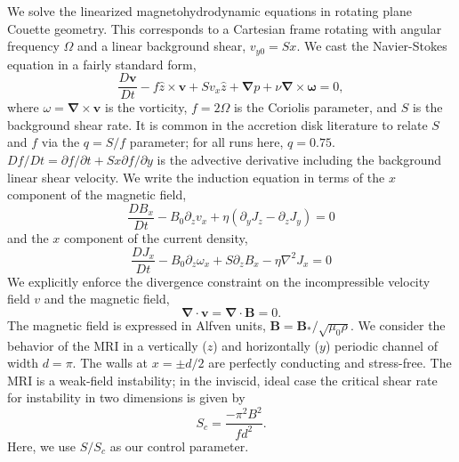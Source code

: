 \documentclass[aps,prl,reprint,superscriptaddress]{revtex4-1}
\newcommand{\SSC}{S/S_{c}}
\begin{document}
We solve the linearized magnetohydrodynamic equations in rotating plane Couette geometry.
This corresponds to a Cartesian frame rotating with angular frequency $\Omega$ and a linear background shear, $v_{y0} = Sx$. 
We cast the Navier-Stokes equation in a fairly standard form,
\begin{equation}
  \label{eq:ns}
  \frac{D \mathbf{v}}{Dt} - f \hat{z} \times \mathbf{v} + S v_x \hat{z} + \mathbf{\nabla}{p} + \nu \mathbf{\nabla} \times \mathbf{\omega} = 0,
\end{equation}
where $\omega = \mathbf{\nabla} \times \mathbf{v}$ is the vorticity, $f = 2 \Omega$ is the Coriolis parameter, and $S$ is the background shear rate.
It is common in the accretion disk literature to relate $S$ and $f$ via the $q = S/f$ parameter; for all runs here, $q = 0.75$.
$Df/Dt = \partial f/\partial t + S x \partial f/\partial y$ is the advective derivative including the background linear shear velocity.  We write the induction equation in terms of the $x$ component of the magnetic field,
\begin{equation}
  \label{eq:Bx}
  \frac{D B_x}{Dt} - B_0 \partial_z v_x + \eta (\partial_y J_z - \partial_z J_y) = 0
\end{equation}
and the $x$ component of the current density,
\begin{equation}
  \label{eq:Jx}
  \frac{D J_x}{Dt} - B_0 \partial_z \omega_x + S \partial_z B_x - \eta \nabla^2 J_x = 0
\end{equation}
We explicitly enforce the divergence constraint on the incompressible velocity field $v$ and the magnetic field,
\begin{equation}
  \label{eq:divu}
  \mathbf{\nabla} \cdot \mathbf{v} = \mathbf{\nabla} \cdot \mathbf{B} = 0.
\end{equation}
The magnetic field is expressed in Alfven units, $\mathbf{B} = \mathbf{B_*}/\sqrt{\mu_0 \rho}$.
We consider the behavior of the MRI in a vertically ($z$) and horizontally ($y$) periodic channel of width $d = \pi$. The walls at $x = \pm d/2$ are perfectly conducting and stress-free. The MRI is a weak-field instability; in the inviscid, ideal case the critical shear rate for instability in two dimensions is given by
\begin{equation}
  \label{eq:Sc}
  S_c = \frac{-\pi^2 B^2}{f d^2}.
\end{equation}
Here, we use $\SSC$ as our control parameter. 
\end{document}
